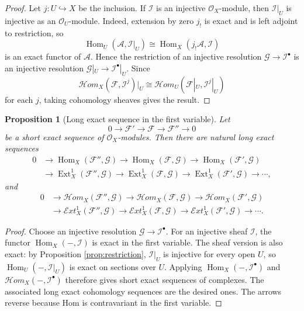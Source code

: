 \documentclass[11pt,a4paper]{article}
\numberwithin{equation}{section}
\theoremstyle{plain}
\newtheorem{proposition}[theorem]{Proposition}
\theoremstyle{definition}
\theoremstyle{remark}
\newcommand{\OO}{\mathcal O}
\newcommand{\F}{\mathcal F}
\newcommand{\G}{\mathcal G}
\newcommand{\I}{\mathcal I}
\newcommand{\A}{\mathcal A}
\DeclareMathOperator{\Ext}{Ext}
\DeclareMathOperator{\Hom}{Hom}
\newcommand{\sExt}{\mathcal{E}\!xt}
\newcommand{\sHom}{\mathcal{H}\!om}
\begin{document}
\begin{proof}
Let \(j:U\hookrightarrow X\) be the inclusion.  If \(\I\) is an injective \(\OO_X\)-module, then \(\I|_U\) is injective as an \(\OO_U\)-module.  Indeed, extension by zero \(j_!\) is exact and is left adjoint to restriction, so
\[
  \Hom_U(\A,\I|_U)
  \cong
  \Hom_X(j_!\A,\I)
\]
is an exact functor of \(\A\).  Hence the restriction of an injective resolution \(\G\to\I^\bullet\) is an injective resolution \(\G|_U\to\I^\bullet|_U\).  Since
\[
  \sHom_X(\F,\I^j)|_U
  \cong
  \sHom_U(\F|_U,\I^j|_U)
\]
for each \(j\), taking cohomology sheaves gives the result.
\end{proof}

\begin{proposition}[Long exact sequence in the first variable]\label{prop:les-first-variable}
Let
\[
  0\longrightarrow \F'\longrightarrow \F\longrightarrow \F''\longrightarrow0
\]
be a short exact sequence of \(\OO_X\)-modules.  Then there are natural long exact sequences
\[
\begin{aligned}
0&\longrightarrow \Hom_X(\F'',\G)
 \longrightarrow \Hom_X(\F,\G)
 \longrightarrow \Hom_X(\F',\G) \\
&\longrightarrow \Ext_X^1(\F'',\G)
 \longrightarrow \Ext_X^1(\F,\G)
 \longrightarrow \Ext_X^1(\F',\G)
 \longrightarrow\cdots,
\end{aligned}
\]
and
\[
\begin{aligned}
0&\longrightarrow \sHom_X(\F'',\G)
 \longrightarrow \sHom_X(\F,\G)
 \longrightarrow \sHom_X(\F',\G) \\
&\longrightarrow \sExt_X^1(\F'',\G)
 \longrightarrow \sExt_X^1(\F,\G)
 \longrightarrow \sExt_X^1(\F',\G)
 \longrightarrow\cdots .
\end{aligned}
\]
\end{proposition}

\begin{proof}
Choose an injective resolution \(\G\to\I^\bullet\).  For an injective sheaf \(\I\), the functor \(\Hom_X(-,\I)\) is exact in the first variable.  The sheaf version is also exact: by Proposition \ref{prop:restriction}, \(\I|_U\) is injective for every open \(U\), so \(\Hom_U(-,\I|_U)\) is exact on sections over \(U\).  Applying \(\Hom_X(-,\I^\bullet)\) and \(\sHom_X(-,\I^\bullet)\) therefore gives short exact sequences of complexes.  The associated long exact cohomology sequences are the desired ones.  The arrows reverse because Hom is contravariant in the first variable.
\end{proof}
\end{document}
